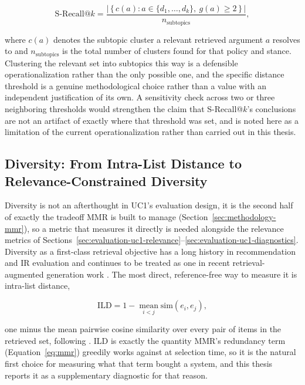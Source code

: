 \begin{equation}
\mathrm{S\text{-}Recall}@k = \frac{\left|\, \{\, c(a) : a \in \{d_1,\dots,d_k\},\ g(a) \geq 2 \,\}\, \right|}
{n_{\text{subtopics}}},
\label{eq:evaluation-srecall}
\end{equation}

\noindent where $c(a)$ denotes the subtopic cluster a relevant retrieved argument $a$ resolves to
and $n_{\text{subtopics}}$ is the total number of clusters found for that policy and stance.
Clustering the relevant set into subtopics this way is a defensible operationalization rather than
the only possible one, and the specific distance threshold is a genuine methodological choice
rather than a value with an independent justification of its own. A sensitivity check across two or
three neighboring thresholds would strengthen the claim that S-Recall@$k$'s conclusions are not an
artifact of exactly where that threshold was set, and is noted here as a limitation of the current
operationalization rather than carried out in this thesis.

\subsection{Diversity: From Intra-List Distance to Relevance-Constrained Diversity}
\label{sec:evaluation-uc1-diversity}

Diversity is not an afterthought in UC1's evaluation design, it is the second half of exactly the
tradeoff MMR is built to manage (Section~\ref{sec:methodology-mmr}), so a metric that measures it
directly is needed alongside the relevance metrics of
Sections~\ref{sec:evaluation-uc1-relevance}--\ref{sec:evaluation-uc1-diagnostics}. Diversity as a
first-class retrieval objective has a long history in recommendation and IR evaluation
\cite{ziegler2005diversification,clarke2008novelty} and continues to be treated as one in recent
retrieval-augmented generation work \cite{lu2026diversity}. The most direct, reference-free way to
measure it is intra-list distance,

\begin{equation}
\mathrm{ILD} = 1 - \operatorname*{mean}_{i<j} \mathrm{sim}(e_i, e_j),
\label{eq:evaluation-ild}
\end{equation}

\noindent one minus the mean pairwise cosine similarity over every pair of items in the retrieved
set, following \textcite{carbonell1998mmr}. ILD is exactly the quantity MMR's redundancy term
(Equation~\ref{eq:mmr}) greedily works against at selection time, so it is the natural first choice
for measuring what that term bought a system, and this thesis reports it as a supplementary
diagnostic for that reason.


